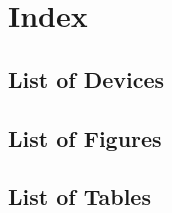 \section{Index}

\subsection{List of Devices}



\subsection{List of Figures}
\listoffigures

\subsection{List of Tables}
\listoftables               %